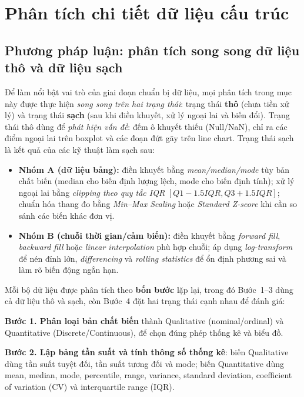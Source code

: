 \section{Phân tích chi tiết dữ liệu cấu trúc}

\subsection*{Phương pháp luận: phân tích song song dữ liệu thô và dữ liệu sạch}

Để làm nổi bật vai trò của giai đoạn chuẩn bị dữ liệu, mọi phân tích trong mục này được thực hiện \emph{song song trên hai trạng thái}: trạng thái \textbf{thô} (chưa tiền xử lý) và trạng thái \textbf{sạch} (sau khi điền khuyết, xử lý ngoại lai và biến đổi). Trạng thái thô dùng để \emph{phát hiện vấn đề}: đếm ô khuyết thiếu (Null/NaN), chỉ ra các điểm ngoại lai trên boxplot và các đoạn đứt gãy trên line chart. Trạng thái sạch là kết quả của các kỹ thuật làm sạch sau:

\begin{itemize}[leftmargin=*]
    \item \textbf{Nhóm A (dữ liệu bảng):} điền khuyết bằng \emph{mean/median/mode} tùy bản chất biến (median cho biến định lượng lệch, mode cho biến định tính); xử lý ngoại lai bằng \emph{clipping theo quy tắc IQR} $[Q1 - 1.5IQR, Q3 + 1.5IQR]$; chuẩn hóa thang đo bằng \emph{Min--Max Scaling} hoặc \emph{Standard Z-score} khi cần so sánh các biến khác đơn vị.
    \item \textbf{Nhóm B (chuỗi thời gian/cảm biến):} điền khuyết bằng \emph{forward fill}, \emph{backward fill} hoặc \emph{linear interpolation} phù hợp chuỗi; áp dụng \emph{log-transform} để nén đỉnh lớn, \emph{differencing} và \emph{rolling statistics} để ổn định phương sai và làm rõ biến động ngắn hạn.
\end{itemize}

Mỗi bộ dữ liệu được phân tích theo \textbf{bốn bước} lặp lại, trong đó Bước~1--3 dùng cả dữ liệu thô và sạch, còn Bước~4 đặt hai trạng thái cạnh nhau để đánh giá:

\textbf{Bước 1. Phân loại bản chất biến} thành Qualitative (nominal/ordinal) và Quantitative (Discrete/Continuous), để chọn đúng phép thống kê và biểu đồ.

\textbf{Bước 2. Lập bảng tần suất và tính thông số thống kê}: biến Qualitative dùng tần suất tuyệt đối, tần suất tương đối và mode; biến Quantitative dùng mean, median, mode, percentile, range, variance, standard deviation, coefficient of variation (CV) và interquartile range (IQR).

